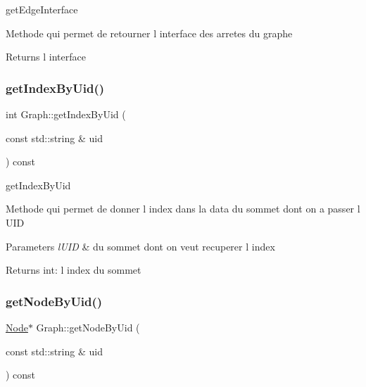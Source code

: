 get\+Edge\+Interface 

Methode qui permet de retourner l interface des arretes du graphe

\begin{DoxyReturn}{Returns}
l interface 
\end{DoxyReturn}
\mbox{\label{class_graph_a2d8d8d9edb8a496d5c252132cdbbbc08}} 
\subsubsection{\texorpdfstring{get\+Index\+By\+Uid()}{getIndexByUid()}}
{\footnotesize\ttfamily int Graph\+::get\+Index\+By\+Uid (\begin{DoxyParamCaption}\item[{const std\+::string \&}]{uid }\end{DoxyParamCaption}) const}



get\+Index\+By\+Uid 

Methode qui permet de donner l index dans la data du sommet dont on a passer l U\+ID


\begin{DoxyParams}{Parameters}
{\em l\textquotesingle{}\+U\+ID} & du sommet dont on veut recuperer l index \\
\hline
\end{DoxyParams}
\begin{DoxyReturn}{Returns}
int\+: l index du sommet 
\end{DoxyReturn}
\mbox{\label{class_graph_a6f882885bf6f2c1b492985263a45d2b1}} 
\subsubsection{\texorpdfstring{get\+Node\+By\+Uid()}{getNodeByUid()}}
{\footnotesize\ttfamily \mbox{\hyperlink{class_node}{Node}}$\ast$ Graph\+::get\+Node\+By\+Uid (\begin{DoxyParamCaption}\item[{const std\+::string \&}]{uid }\end{DoxyParamCaption}) const}



